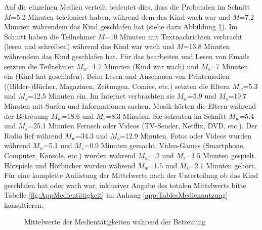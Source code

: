 Auf die einzelnen Medien verteilt bedeutet dies, dass die Probanden im Schnitt $M$=5.2 Minuten telefoniert haben, während dem das Kind wach war und $M$=7.2 Minuten währendem das Kind geschlafen hat (siehe dazu Abbildung \ref{fig:Medientätigkeit}). Im Schnitt haben die Teilnehmer $M$=10 Minuten mit Textnachrichten verbracht (lesen und schreiben) während das Kind war wach und $M$=13.8 Minuten währendem das Kind geschlafen hat. Für das bearbeiten und Lesen von Emails setzten die Teilnehmer $M_{w}$=1.7 Minuten (Kind war wach) und $M_{s}$=7 Minuten ein (Kind hat geschlafen). Beim Lesen und Anschauen von Printemedien ((Bilder-)Bücher, Magazinen, Zeitungen, Comics, etc.) setzten die Eltern $M_{w}$=5.3 und $M_{s}$=12.5 Minuten ein. Im Internet verbrachten sie $M_{w}$=5.9 und $M_{s}$=19.7 Minuten mit Surfen und Informationen suchen. Musik hörten die Eltern während der Betreuung $M_{w}$=18.6 und $M_{s}$=8.3 Minuten. Sie schauten im Schnitt $M_{w}$=5.4 und $M_{s}$=25.1 Minuten Fernseh oder Videos (TV-Sender, Netflix, DVD, etc.). Der Radio lief während $M_{w}$=34.3 und $M_{s}$=12.9 Minuten. Fotos oder Videos wurden während $M_{w}$=5.1 und $M_{s}$=0.9 Minuten gemacht. Video-Games (Smartphone, Computer, Konsole, etc.) wurden während $M_{w}$=.2 und $M_{s}$=1.5 Minuten gespielt. Hörspiele und Hörbücher wurden während $M_{w}$=1.5 und $M_{s}$=2.1 Minuten gehört. Für eine komplette Auflistung der Mittelwerte nach der Unterteilung ob das Kind geschlafen hat oder wach war, inklusiver Angabe des totalen Mittelwerts bitte Tabelle \ref{fig:AppMedientätigkeit} im Anhang \ref{app:TablesMediennutzung} konsultieren.

\begin{figure}%
\caption{Mittelwerte der Medientätigkeiten während der Betreuung}\label{fig:Medientätigkeit}
{}
\end{figure}


